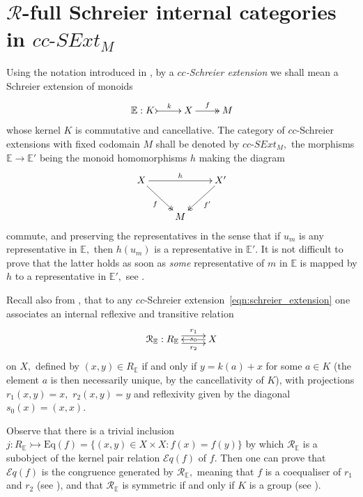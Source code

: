 \documentclass[a4paper]{amsart}
\theoremstyle{plain}
\theoremstyle{definition}
\theoremstyle{remark}
\newcommand{\rel}[1]{\mathcal{R}_{\mathbb{#1}}} %
\begin{document}
\section{$\mathcal{R}$-full Schreier internal categories in $cc\text{-}SExt_M$}
Using the notation introduced in \cite[Definition 3.2]{AMR}, by a \emph{$cc$-Schreier extension} we shall mean a Schreier extension of monoids
\begin{equation}
\label{eqn:schreier_extension}
\xymatrix{{\mathbb{E}:K} \ar@{>->}[r]^-{k} &X \ar@{->>}[r]^-{f} &M}
\end{equation}
whose kernel $K$ is commutative and cancellative. The category of $cc$-Schreier extensions with fixed codomain $M$ shall be denoted by $cc\text{-}SExt_M,$ the morphisms $\mathbb{E}\rightarrow\mathbb{E}'$ being the monoid homomorphisms $h$ making the diagram
\begin{equation*}
\xymatrix{
X \ar@{->>}[rd]_-f \ar[rr]^-h &\ &{X'} \ar@{->>}[ld]^-{f'} \\
&M
}
\end{equation*}
commute, and preserving the representatives in the sense that if $u_m$ is any representative in $\mathbb{E},$ then $h(u_m)$ is a representative in $\mathbb{E}'.$ It is not difficult to prove that the latter holds as soon as \emph{some} representative of $m$ in $\mathbb{E}$ is mapped by $h$ to a representative in $\mathbb{E}',$ see \cite[Proposition 2.8]{AMR}.

Recall also from \cite[Section 5]{AMR}, that to any $cc$-Schreier extension~\eqref{eqn:schreier_extension} one associates an internal reflexive and transitive relation
\begin{equation*}
\xymatrix{ {\rel{E}:R_{\mathbb{E}}}\ar@<.9ex>[r]^-{r_1} \ar@<-.9ex>[r]_-{r_2} &X \ar[l]|-{s_0}}
\end{equation*}
on $X,$ defined by $(x,y)\in R_{\mathbb{E}}$ if and only if $y=k(a)+x$ for some $a\in K$ (the element $a$ is then necessarily unique, by the cancellativity of $K$), with projections $r_1(x,y)=x,$ $r_2(x,y)=y$ and reflexivity given by the diagonal $s_0(x)=(x,x).$

Observe that there is a trivial inclusion $j\colon R_{\mathbb{E}}\rightarrowtail \mathrm{Eq}(f)=\{(x,y)\in X\times X:f(x)=f(y)\}$ by which $\rel{E}$ is a subobject of the kernel pair relation $\mathcal{E}q(f)$ of $f.$ Then one can prove that $\mathcal{E}q(f)$ is the congruence generated by $\rel{E},$ meaning that $f$ is a coequaliser of $r_1$ and $r_2$ (see \cite[Proposition 5.1]{AMR}), and that $\rel{E}$ is symmetric if and only if $K$ is a group (see \cite[Corollary 5.3]{AMR}).
\end{document}
